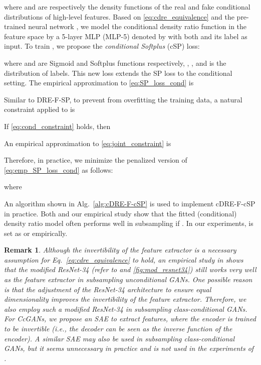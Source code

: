 \documentclass[final,12pt, 3p,times]{elsarticle}
\newtheorem{remark}{Remark}
\begin{document}
where  and  are respectively the density functions of the real and fake conditional distributions of high-level features. Based on \cref{eq:cdre_equivalence} and the pre-trained neural network , we model the conditional density ratio function  in the feature space by a 5-layer MLP (MLP-5) denoted by  with both  and its label  as input. To train , we propose the \textit{conditional Softplus} (cSP) loss: 

where  and  are Sigmoid and Softplus functions respectively, , , and  is the distribution of labels. This new loss extends the SP loss \cite{ding2020subsampling} to the conditional setting. The empirical approximation to \cref{eq:SP_loss_cond} is 

Similar to DRE-F-SP, to prevent  from overfitting the training data, a natural constraint applied to  is 

If \cref{eq:cond_constraint} holds, then

An empirical approximation to \cref{eq:joint_constraint} is

Therefore, in practice, we minimize the penalized version of \cref{eq:emp_SP_loss_cond} as follows:

where 



An algorithm shown in Alg.\ \ref{alg:cDRE-F-cSP} is used to implement cDRE-F-cSP in practice. Both \cite{ding2020subsampling} and our empirical study show that the fitted (conditional) density ratio model often performs well in subsampling if . In our experiments,  is set as  or  empirically. 

\begin{remark}
	Although the invertibility of the feature extractor  is a necessary assumption for Eq.\ \eqref{eq:cdre_equivalence} to hold, an empirical study in \cite{ding2020subsampling} shows that the modified ResNet-34 (refer to  and \cref{fig:mod_resnet34}) still works very well as the feature extractor in subsampling unconditional GANs. One possible reason is that the adjustment of the ResNet-34 architecture to ensure equal dimensionality improves the invertibility of the feature extractor. Therefore, we also employ such a modified ResNet-34 in subsampling class-conditional GANs. For CcGANs, we propose an SAE to extract features, where the encoder is trained to be invertible (i.e., the decoder can be seen as the inverse function of the encoder). A similar SAE may also be used in subsampling class-conditional GANs, but it seems unnecessary in practice and is not used in the experiments of .
\end{remark}
\end{document}
